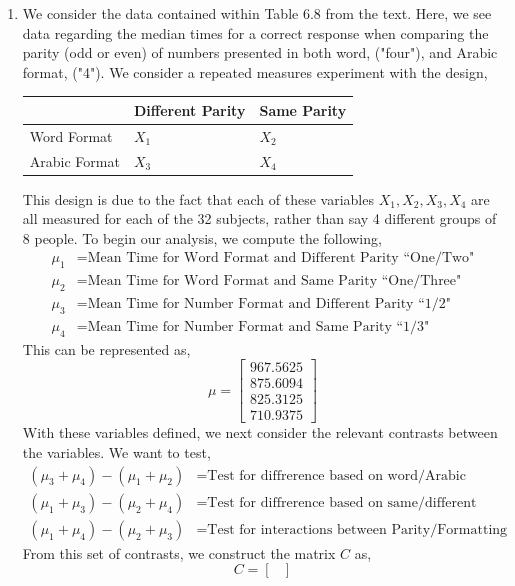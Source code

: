\documentclass[letterpaper,10pt]{article}
\begin{document}
\begin{enumerate}
\item We consider the data contained within Table 6.8 from the text. Here, we see data regarding the median times for a correct response when comparing the parity (odd or even) of numbers presented in both word, ("four"), and Arabic format, ("4"). We consider a repeated measures experiment with the design,
\begin{center}
\begin{tabular}{|l|l|l|}
\hline
& Different Parity & Same Parity\\\hline
Word Format & $X_1$ & $X_2$\\\hline
Arabic Format & $X_3$ & $X_4$\\\hline
\end{tabular}
\end{center}
This design is due to the fact that each of these variables $X_1, X_2, X_3, X_4$ are all measured for each of the 32 subjects, rather than say 4 different groups of 8 people. To begin our analysis, we compute the following,
\begin{align*}
\mu_1 &= \text{Mean Time for Word Format and Different Parity ``One/Two"}\\
\mu_2 &= \text{Mean Time for Word Format and Same Parity ``One/Three"}\\
\mu_3 &= \text{Mean Time for Number Format and Different Parity ``1/2"}\\
\mu_4 &= \text{Mean Time for Number Format and Same Parity ``1/3"}
\end{align*}
This can be represented as,
\[\mu = \begin{bmatrix}
967.5625\\875.6094\\825.3125\\710.9375
\end{bmatrix}\]
With these variables defined, we next consider the relevant contrasts between the variables. We want to test,
\begin{align*}
(\mu_3+\mu_4)-(\mu_1+\mu_2) &= \text{Test for diffrerence based on word/Arabic format}\\
(\mu_1+\mu_3)-(\mu_2+\mu_4) &= \text{Test for diffrerence based on same/different parity}\\
(\mu_1+\mu_4)-(\mu_2+\mu_3) &= \text{Test for interactions between Parity/Formatting}
\end{align*}
From this set of contrasts, we construct the matrix $C$ as,
\[C=\begin{bmatrix}

\end{bmatrix}\]
\end{enumerate}
\end{document}
